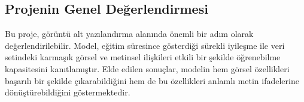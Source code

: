 \documentclass{article}
\begin{document}
\subsection{Projenin Genel Değerlendirmesi}
Bu proje, görüntü alt yazılandırma alanında önemli bir adım olarak değerlendirilebilir. Model, eğitim süresince gösterdiği sürekli iyileşme ile veri setindeki karmaşık görsel ve metinsel ilişkileri etkili bir şekilde öğrenebilme kapasitesini kanıtlamıştır. Elde edilen sonuçlar, modelin hem görsel özellikleri başarılı bir şekilde çıkarabildiğini hem de bu özellikleri anlamlı metin ifadelerine dönüştürebildiğini göstermektedir.


\newpage

\end{document}
